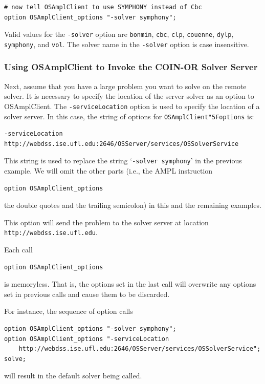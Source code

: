 \documentclass[11pt]{article}
\renewcommand{\_}{{\char"5F}}
\renewcommand{\{}{{\char"7B}}
\renewcommand{\}}{{\char"7D}}
\renewcommand{\^}{{\char"0D}}
\renewcommand{\'}{{\char"0D}}
\begin{document}
\begin{enumerate}[Step 1:]
\begin{verbatim}
# now tell OSAmplClient to use SYMPHONY instead of Cbc
option OSAmplClient_options "-solver symphony";
\end{verbatim}

Valid values for the {\tt -solver} option are {\tt bonmin}, {\tt cbc}, {\tt clp}, {\tt couenne}, 
{\tt dylp}, {\tt symphony}, and {\tt vol}.   The solver name in the {\tt -solver} option is case insensitive.  


\subsubsection{Using OSAmplClient to Invoke the COIN-OR Solver Server}\label{section:remoteampl}

Next, assume that you have a large problem you want to solve on the remote solver. It is necessary 
to specify the location of the server solver as an option to OSAmplClient. 
The {\tt -serviceLocation} option is used to specify the location of a solver server. 
In this case, the string of options for {\tt OSAmplClient\_options} is:

\begin{verbatim}
-serviceLocation  http://webdss.ise.ufl.edu:2646/OSServer/services/OSSolverService
\end{verbatim}

This string is used to replace the string `{\tt -solver symphony}' in the previous example. 
We will omit the other parts (i.e., the AMPL instruction
\begin{verbatim}
option OSAmplClient_options
\end{verbatim}
the double quotes and the trailing semicolon) in this and the remaining examples.
 
This option will send the problem to the solver server at location {\tt http://webdss.ise.ufl.edu}.   


\medskip


Each call 
\begin{verbatim}
option OSAmplClient_options
\end{verbatim}
is memoryless. That is, the options set in the last call will overwrite any options set in previous calls
and cause them to be discarded.

For instance, the sequence of option calls
\begin{verbatim}
option OSAmplClient_options "-solver symphony";
option OSAmplClient_options "-serviceLocation  
    http://webdss.ise.ufl.edu:2646/OSServer/services/OSSolverService";
solve;
\end{verbatim}
will result in the default solver being called. 


\end{enumerate}
\end{document}

